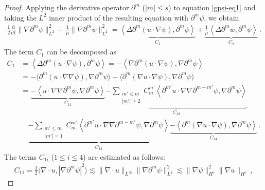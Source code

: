 \documentclass[10pt,a4paper]{amsart}
\def\d{\mathrm{d}}
\def\p{\partial}
\begin{document}
\begin{proof}

Applying the derivative operator $\partial^m$ ($|m| \le s$) to equation \eqref{gpsi-eq1} and taking the $L^2$ inner product of the resulting equation with $\partial^m \psi$, we obtain
\begin{equation}\label{gpsi-eq4}
\begin{aligned}
\frac{1}{2} \frac{\d}{\d t} \|\nabla \partial^m \psi\|_{L^2}^2 + \frac{1}{\mu} \|\nabla \partial^m \psi\|_{L^2}^2
=  \underset{C_{1}}{\underbrace{\left\langle \Delta \partial^m (u \cdot \nabla \psi), \partial^m \psi \right\rangle}}+\underset{C_{2}}{\underbrace{\frac{1}{\mu} \left\langle \Delta \partial^m w, \partial^m \psi \right\rangle}} \,.
\end{aligned}
\end{equation}
The term $C_1$ can be decomposed as
\begin{equation*}
\begin{aligned}
C_1 & =\left\langle \Delta \partial^m (u \cdot \nabla \psi), \partial^m \psi \right\rangle = -\left\langle \nabla \partial^m (u \cdot \nabla \psi), \nabla\partial^m \psi \right\rangle\\&
=-\langle \p^m(u\cdot\nabla\nabla\psi),\nabla\p^m\psi\rangle-\langle\p^m(\nabla u \cdot\nabla \psi),\nabla\p^m\psi  \rangle\\&
=\underset{C_{11}}{\underbrace{-\left\langle u \cdot \nabla \nabla \partial^m \psi, \nabla \partial^m \psi \right\rangle}}
\underset{C_{12}}{\underbrace{- \sum_{\substack{m' \leq m \\ |m'| \geq 2}} C_m^{m'} \left\langle \partial^{m'} u \cdot \nabla \nabla \partial^{m - m'} \psi, \nabla \partial^m \psi \right\rangle}}\\&
\quad\underset{C_{13}}{\underbrace{- \sum_{\substack{m' \leq m \\ |m'| = 1}} C_m^{m'} \left\langle \partial^{m'} u \cdot \nabla \nabla \partial^{m - m'} \psi, \nabla \partial^m \psi \right\rangle}}
\underset{C_{14}}{\underbrace{- \left\langle \partial^m (\nabla u \cdot \nabla \psi), \nabla \partial^m \psi \right\rangle}}  \,.
\end{aligned}
\end{equation*}
The terms $C_{1i}$ ($1 \le i \le 4$) are estimated as follows:
\begin{equation*}
\begin{aligned}
C_{11} = \frac{1}{2} \langle \nabla \cdot u, | \nabla \p^m \psi |^2  \rangle \lesssim \|\nabla \cdot u \|_{L^\infty} \| \nabla \p^m \psi \|_{L^2}^2 \lesssim \| \nabla \psi \|^2_{H^s} \| \nabla u \|_{H^s} \,,

\end{aligned}
\end{equation*}
\end{proof}
\end{document}
